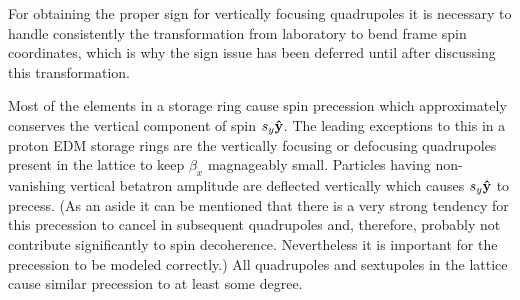 \documentclass[]{article}
\begin{document}
For obtaining the proper sign for vertically
focusing quadrupoles it is necessary to handle consistently
the transformation from laboratory to bend frame spin
coordinates, which is why the sign issue has been deferred until
after discussing this transformation.

Most of the elements in a storage ring cause
spin precession which approximately conserves the
vertical component of spin $s_y{\bf\hat y}$. The leading
exceptions to this in a proton EDM storage rings are the
vertically focusing or defocusing quadrupoles  
present in the lattice to keep $\beta_x$ magnageably small. 
Particles having non-vanishing vertical betatron amplitude are
deflected vertically which causes $s_y{\bf\hat y}$ to
precess. (As an aside it can be mentioned that there is
a very strong tendency for this precession to cancel
in subsequent quadrupoles and, therefore, probably not
contribute significantly to spin decoherence. Nevertheless
it is important for the precession to be modeled
correctly.)
All quadrupoles and sextupoles in the lattice
cause similar precession to at least some degree. 
\end{document}
